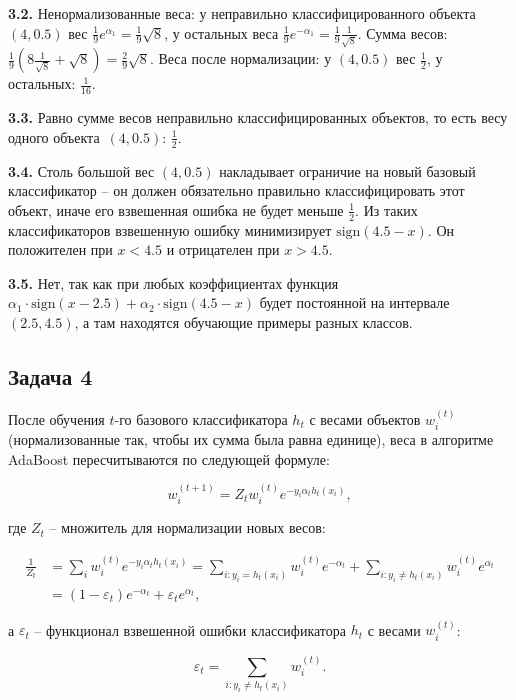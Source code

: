 \documentclass[a4paper, 12pt, onepage]{article}
\begin{document}
\textbf{3.2.} Ненормализованные веса: у неправильно классифицированного объекта $(4, 0.5)$ вес $\frac 19 e^{\alpha_1} = \frac 19 \sqrt{8}$,
у остальных веса $\frac 19 e^{-\alpha_1} = \frac 19 \frac{1}{\sqrt{8}}$. Сумма весов: $\frac 19 \left( 8 \frac{1}{\sqrt{8}} + \sqrt{8}\right) = \frac 29 \sqrt{8}$.
Веса после нормализации: у $(4, 0.5)$ вес $\frac 12$, у остальных: $\frac{1}{16}$.

\textbf{3.3.} Равно сумме весов неправильно классифицированных объектов, то есть весу одного объекта~$(4, 0.5)$: $\frac{1}{2}$.

\textbf{3.4.} Столь большой вес $(4, 0.5)$ накладывает ограничие на новый базовый классификатор -- он должен обязательно правильно
классифицировать этот объект, иначе его взвешенная ошибка не будет меньше $\frac 12$. Из таких классификаторов взвешенную ошибку
минимизирует $\mbox{sign}(4.5 - x)$. Он положителен при $x < 4.5$ и отрицателен при $x > 4.5$.

\textbf{3.5.} Нет, так как при любых коэффициентах функция $\alpha_1 \cdot \mbox{sign}(x - 2.5) + \alpha_2 \cdot \mbox{sign}(4.5 - x)$ будет
постоянной на интервале $(2.5, 4.5)$, а там находятся обучающие примеры разных классов.


\newpage
\subsection*{Задача 4}

После обучения $t$-го базового классификатора $h_t$ с весами объектов $w^{(t)}_i$ (нормализованные так,
чтобы их сумма была равна единице), веса в алгоритме AdaBoost пересчитываются по следующей формуле:

$$ w^{(t+1)}_i = Z_t w^{(t)}_i e^{-y_i \alpha_t h_t(x_i)}, $$

где $Z_t$ -- множитель для нормализации новых весов:

\begin{align*}
 \frac{1}{Z_t}
    &= \sum_i w^{(t)}_i e^{-y_i \alpha_t h_t(x_i)}
    = \sum_{i: y_i = h_t(x_i)} w^{(t)}_i e^{-\alpha_t} +
      \sum_{i: y_i \ne h_t(x_i)} w^{(t)}_i e^{\alpha_t} \\
    &= (1 - \varepsilon_t) e^{-\alpha_t} + \varepsilon_t e^{\alpha_t},
\end{align*}

а $\varepsilon_t$ -- функционал взвешенной ошибки классификатора $h_t$ с весами $w^{(t)}_i$:

$$ \varepsilon_t = \sum_{i: y_i \ne h_t(x_i)} w^{(t)}_i. $$
\end{document}
